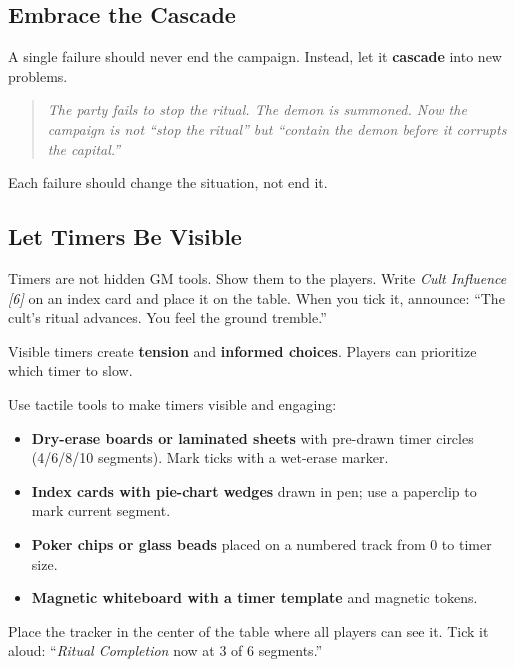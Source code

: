 \subsection{Embrace the Cascade}

A single failure should never end the campaign. Instead, let it \textbf{cascade} into new problems.

\begin{quote}
\textit{The party fails to stop the ritual. The demon is summoned. Now the campaign is not ``stop the ritual'' but ``contain the demon before it corrupts the capital.''}
\end{quote}

Each failure should change the situation, not end it.

\subsection{Let Timers Be Visible}

Timers are not hidden GM tools. Show them to the players. Write \emph{Cult Influence [6]} on an index card and place it on the table. When you tick it, announce: ``The cult's ritual advances. You feel the ground tremble.''

Visible timers create \textbf{tension} and \textbf{informed choices}. Players can prioritize which timer to slow.

\begin{tcolorbox}[colback=blue!5!white, colframe=blue!75!black, title=Physical Trackers for Timers,breakable]
Use tactile tools to make timers visible and engaging:
\begin{itemize}
  \item \textbf{Dry-erase boards or laminated sheets} with pre-drawn timer circles (4/6/8/10 segments). Mark ticks with a wet-erase marker.
  \item \textbf{Index cards with pie-chart wedges} drawn in pen; use a paperclip to mark current segment.
  \item \textbf{Poker chips or glass beads} placed on a numbered track from 0 to timer size.
  \item \textbf{Magnetic whiteboard with a timer template} and magnetic tokens.
\end{itemize}
Place the tracker in the center of the table where all players can see it. Tick it aloud: ``\emph{Ritual Completion} now at 3 of 6 segments.''
\end{tcolorbox}

